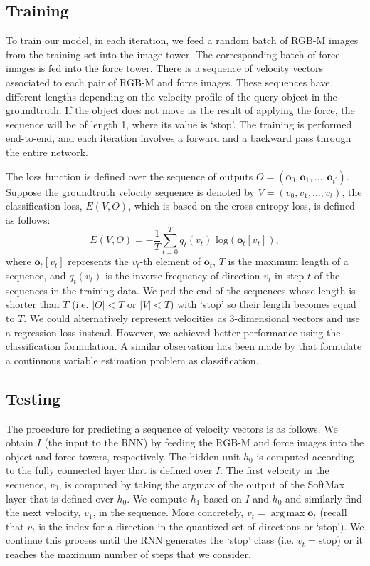 \documentclass[runningheads]{llncs}
\DeclareMathOperator*{\argmax}{arg\,max}
\begin{document}
\subsection{Training}
To train our model, in each iteration, we feed a random batch of RGB-M images from the training set into the image tower. The corresponding batch of force images is fed into the force tower. There is a sequence of velocity vectors associated to each pair of RGB-M and force images. These sequences have different lengths depending on the velocity profile of the query object in the groundtruth. If the object does not move as the result of applying the force, the sequence will be of length 1, where its value is `stop'. The training is performed end-to-end, and each iteration involves a forward and a backward pass through the entire network. 

The loss function is defined over the sequence of outputs $O=(\mathbf{o}_0, \mathbf{o}_1,\ldots,\mathbf{o}_{t^\prime})$. Suppose the groundtruth velocity sequence is denoted by $V=(v_0, v_1, \ldots, v_t)$, the classification loss, $E(V, O)$, which is based on the cross entropy loss, is defined as follows:
\begin{equation}
     E(V, O) = -\frac{1}{T}\sum_{t = 0}^T q_t(v_t)\,\, \mbox{log}(\mathbf{o}_t[v_t]),
\end{equation}
where $\mathbf{o}_t[v_t]$ represents the $v_t$-th element of $\mathbf{o}_t$, $T$ is the maximum length of a sequence, and $q_t(v_t)$ is the inverse frequency of direction $v_t$ in step $t$ of the sequences in the training data. We pad the end of the sequences whose length is shorter than $T$ (i.e. $|O| < T$ or $|V| < T$) with `stop' so their length becomes equal to $T$. We could alternatively represent velocities as 3-dimensional vectors and use a regression loss instead. However, we achieved better performance using the classification formulation. A similar observation has been made by \cite{wang15,walker15} that formulate a continuous variable estimation problem as classification.

\subsection{Testing}
The procedure for predicting a sequence of velocity vectors is as follows. We obtain $I$ (the input to the RNN) by feeding the RGB-M and force images into the object and force towers, respectively. The hidden unit $h_0$ is computed according to the fully connected layer that is defined over $I$. The first velocity in the sequence, $v_0$, is computed by taking the argmax of the output of the SoftMax layer that is defined over $h_0$. We compute $h_1$ based on $I$ and $h_0$ and similarly find the next velocity, $v_1$, in the sequence. More concretely, $v_t = \argmax \mathbf{o}_t$ (recall that $v_t$ is the index for a direction in the quantized set of directions or `stop'). We continue this process until the RNN generates the `stop' class (i.e. $v_t=\mbox{stop}$) or it reaches the maximum number of steps that we consider. 
\end{document}
